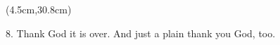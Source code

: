 
{} \mtcaddchapter
{}

\chead[\fancyplain{}{}]%
      {\fancyplain{}{}}
\lfoot[\fancyplain{}{}]%
      {\fancyplain{}{}}
\cfoot[\fancyplain{}{\thepage}]%
      {\fancyplain{}{\thepage}} %
\rfoot[\fancyplain{}{}]%
     {\fancyplain{}{\scriptsize}}
     

\listoftables

\begin{textblock*}{10cm}(4.5cm,30.8cm) %
      \begin{turn}{0} 
            \scriptsize \emojiegg
            \scriptsize 8. Thank God it is over. And just a plain thank you God, too.
            \scriptsize \emojicross
      \end{turn}
\end{textblock*}
 
